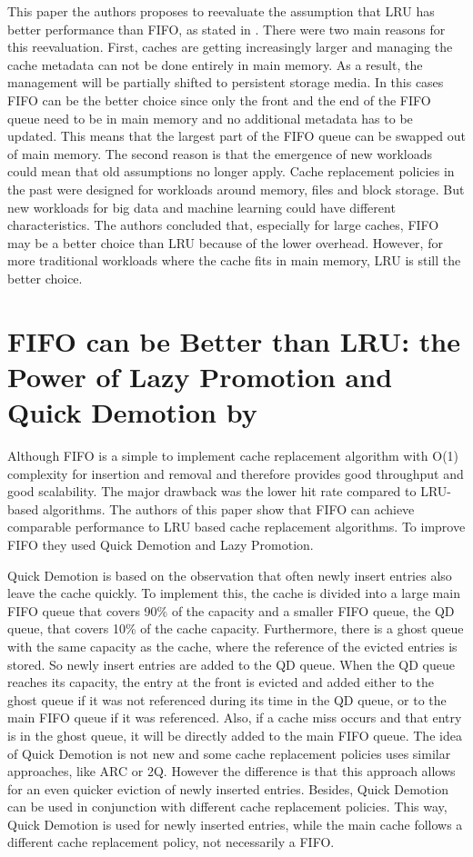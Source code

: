 \documentclass[
	12pt,
	a4paper,
	abstract,
	bibliography=totoc,
	chapterprefix,
	headings=openright,
	numbers=endperiod,
	parskip=half,
	twoside,
]{scrreprt}
\begin{document}
This paper the authors proposes to reevaluate the assumption that LRU 
has better performance than FIFO, as stated in \cite{van1992lru}.
There were two main reasons for this reevaluation.
First, caches are getting increasingly larger and managing the cache metadata can not be done entirely in main memory.
As a result, the management will be partially shifted to persistent storage media.
In this cases FIFO can be the better choice since only the front and the end of the FIFO queue need to be in main memory
and no additional metadata has to be updated.
This means that the largest part of the FIFO queue can be swapped out of main memory.
The second reason is that the emergence of new workloads could mean that old assumptions no longer apply. 
Cache replacement policies in the past were designed for workloads around memory, files and block storage. 
But new workloads for big data and machine learning could have different characteristics.
The authors concluded that, especially for large caches, FIFO may be a better choice than LRU because of the lower overhead. 
However, for more traditional workloads where the cache fits in main memory, LRU is still the better choice.

\section*{FIFO can be Better than LRU: the Power of Lazy Promotion and Quick Demotion by \cite{yang2023fifo}}

Although FIFO is a simple to implement cache replacement algorithm with O(1) complexity for insertion and removal 
and therefore provides good throughput and good scalability.
The major drawback was the lower hit rate compared to LRU-based algorithms.
The authors of this paper \cite{yang2023fifo} show that FIFO can achieve comparable performance to LRU based cache replacement algorithms.
To improve FIFO they used Quick Demotion and Lazy Promotion.

Quick Demotion is based on the observation that often newly insert entries also leave the cache quickly.
To implement this, the cache is divided into a large main FIFO queue that covers 90\% of the capacity and a 
smaller FIFO queue, the QD queue, that covers 10\% of the cache capacity.
Furthermore, there is a ghost queue with the same capacity as the cache, where the reference of the evicted entries is stored.
So newly insert entries are added to the QD queue. When the QD queue reaches its capacity, the entry at the front is evicted and added either to 
the ghost queue if it was not referenced during its time in the QD queue, or to the main FIFO queue if it was referenced.
Also, if a cache miss occurs and that entry is in the ghost queue, it will be directly added to the main FIFO queue.
The idea of Quick Demotion is not new and some cache replacement policies uses similar approaches, like ARC or 2Q.
However the difference is that this approach allows for an even quicker eviction of newly inserted entries.
Besides, Quick Demotion can be used in conjunction with different cache replacement policies.
This way, Quick Demotion is used for newly inserted entries, while the main cache follows a different cache replacement policy, 
not necessarily a FIFO.
\end{document}
